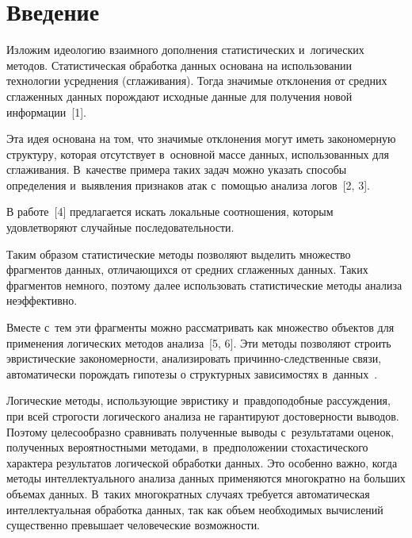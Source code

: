 



\thispagestyle{headings}

\begin{multicols}{2}

\label{st\stat}
  

\section{Введение}

  Изложим идеологию взаимного дополнения статистических и~логических 
методов. Статистическая обработка данных основана на использовании 
технологии усреднения (сглаживания). Тогда значимые отклонения от 
средних сглаженных данных порождают исходные данные для получения 
новой информации~[1]. 

Эта идея основана на том, что значимые отклонения могут 
иметь закономерную структуру, которая отсутствует в~основной массе данных, 
использованных для сглаживания. В~качестве примера таких задач можно 
указать способы определения и~выявления признаков атак с~по\-мощью анализа 
логов~[2, 3]. 
  
  В работе~[4] предлагается искать локальные соотношения, которым 
удовлетворяют случайные последовательности. 

Таким образом статистические 
методы позволяют выделить множество фрагментов данных, отличающихся от 
средних сглаженных данных. Таких фрагментов немного, поэтому далее 
использовать статистические методы анализа неэффективно. 
  
  Вместе с~тем эти фрагменты можно рассматривать как множество объектов 
для применения логических методов анализа~[5, 6]. Эти методы позволяют 
строить эвристические закономерности, анализировать  
при\-чин\-но-след\-ст\-вен\-ные связи, автоматически порождать гипотезы о 
структурных зависимостях в~данных~\cite{6-gru}. 
  
  Логические методы, использующие эвристику и~правдоподобные 
рассуждения, при всей строгости логического анализа не гарантируют 
достоверности выводов. Поэтому целесообразно сравнивать полученные 
выводы с~результатами оценок, полученных вероятностными методами, 
в~предположении стохастического характера результатов логической 
обработки данных. Это особенно важно, когда методы интеллектуального 
анализа данных применяются многократно на больших объемах данных. 
В~таких многократных случаях требуется автоматическая интеллектуальная 
обработка данных, так как объем необходимых вычислений существенно 
превышает человеческие возможности. 
  

\end{multicols}
